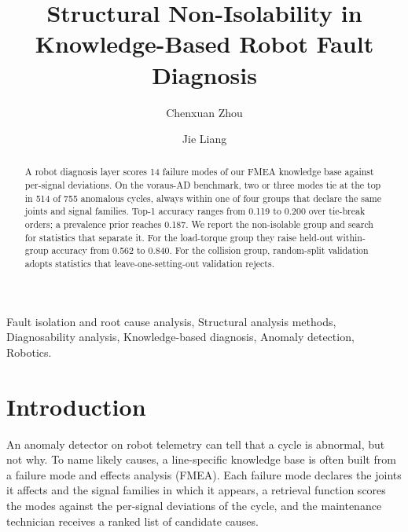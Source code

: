 \documentclass{ifacconf}
\begin{document}
\begin{frontmatter}

\title{Structural Non-Isolability in Knowledge-Based Robot Fault Diagnosis}

\author[uts]{Chenxuan Zhou}
\author[uts]{Jie Liang}
\address[uts]{Faculty of Engineering and Information Technology,
University of Technology Sydney, Ultimo, NSW 2007, Australia
(e-mail: chenxuan.zhou@student.uts.edu.au, jie.liang@uts.edu.au).}

\begin{abstract}
A robot diagnosis layer scores 14 failure modes of our FMEA knowledge base
against per-signal deviations. On the voraus-AD benchmark, two or three modes
tie at the top in 514 of 755 anomalous cycles, always within one of four groups
that declare the same joints and signal families. Top-1 accuracy ranges from
0.119 to 0.200 over tie-break orders; a prevalence prior reaches 0.187. We report
the non-isolable group and search for statistics that separate it. For the
load-torque group they raise held-out within-group accuracy from 0.562 to 0.840.
For the collision group, random-split validation adopts statistics that
leave-one-setting-out validation rejects.
\end{abstract}

\begin{keyword}
Fault isolation and root cause analysis, Structural analysis methods,
Diagnosability analysis, Knowledge-based diagnosis, Anomaly detection,
Robotics.
\end{keyword}

\end{frontmatter}

\section{Introduction}

An anomaly detector on robot telemetry can tell that a cycle is abnormal, but
not why. To name likely causes, a line-specific knowledge base is often built
from a failure mode and effects analysis (FMEA). Each failure mode declares the
joints it affects and the signal families in which it appears, a retrieval
function scores the modes against the per-signal deviations of the cycle, and
the maintenance technician receives a ranked list of candidate causes.
\end{document}
